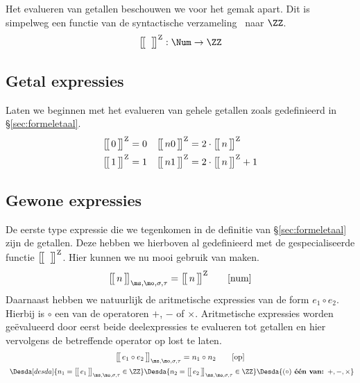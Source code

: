 Het evalueren van getallen beschouwen we voor het gemak apart. Dit is simpelweg een functie van de syntactische verzameling \Num\ naar $\ZZ$.
%
\begin{equation*}
  \Express[Z]{\;}{} : \Num \to \ZZ \\
\end{equation*}


\subsection{Getal expressies}

Laten we beginnen met het evalueren van gehele getallen zoals gedefinieerd in §\ref{sec:formeletaal}.
%
\begin{align*}
  \Express[Z]{0}{} &= 0 &
  \Express[Z]{n 0}{} &= 2 \cdot \Express[Z]{n}{} \\
  \Express[Z]{1}{} &= 1 &
  \Express[Z]{n 1}{} &= 2 \cdot \Express[Z]{n}{} + 1
\end{align*}

\subsection{Gewone expressies}

De eerste type expressie die we tegenkomen in de definitie van §\ref{sec:formeletaal} zijn de getallen. Deze hebben we hierboven al gedefinieerd met de gespecialiseerde functie $\Express[Z]{\;}{}$. Hier kunnen we nu mooi gebruik van maken.
%
\begin{equation*}
  \Express{n}{\ms,\mo,\sigma,\tau} = \Express[Z]{n}{}
  \tag*{[num]}
\end{equation*}
%
Daarnaast hebben we natuurlijk de aritmetische expressies van de form $e_1 \circ e_2$. Hierbij is $\circ$ een van de operatoren $+$, $-$ of $\times$. Aritmetische expressies worden geëvalueerd door eerst beide deelexpressies te evalueren tot getallen en hier vervolgens de betreffende operator op lost te laten.
%
\begin{gather*}
  \Express{e_1 \circ e_2}{\ms,\mo,\sigma,\tau} = n_1 \circ n_2
  \tag*{[op]} \\
  \Desdas{
    \Desda[desda]{n_1 = \Express{e_1}{\ms,\mo,\sigma,\tau} \in \ZZ}
    \Desda{n_2 = \Express{e_2}{\ms,\mo,\sigma,\tau} \in \ZZ}
    \Desda{(\circ) \textbf{ één van: } +, -, \times}
  }
\end{gather*}

